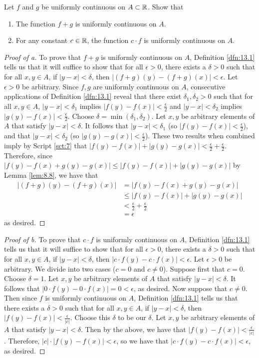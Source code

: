 \documentclass[../main.tex]{subfiles}
\begin{document}
\begin{exercise}\label{exr:13.5}
    Let $f$ and $g$ be uniformly continuous on $A\subset\mathbb{R}$. Show that
    \begin{enumerate}[label={(\alph*)}]
        \item The function $f+g$ is uniformly continuous on $A$.
        \item For any constant $c\in\mathbb{R}$, the function $c\cdot f$ is uniformly continuous on $A$.
    \end{enumerate}
    \begin{proof}[Proof of a]
        To prove that $f+g$ is uniformly continuous on $A$, Definition \ref{dfn:13.1} tells us that it will suffice to show that for all $\epsilon>0$, there exists a $\delta>0$ such that for all $x,y\in A$, if $|y-x|<\delta$, then $|(f+g)(y)-(f+g)(x)|<\epsilon$. Let $\epsilon>0$ be arbitrary. Since $f,g$ are uniformly continuous on $A$, consecutive applications of Definition \ref{dfn:13.1} reveal that there exist $\delta_1,\delta_2>0$ such that for all $x,y\in A$, $|y-x|<\delta_1$ implies $|f(y)-f(x)|<\frac{\epsilon}{2}$ and $|y-x|<\delta_2$ implies $|g(y)-f(x)|<\frac{\epsilon}{2}$. Choose $\delta=\min(\delta_1,\delta_2)$. Let $x,y$ be arbitrary elements of $A$ that satisfy $|y-x|<\delta$. It follows that $|y-x|<\delta_1$ (so $|f(y)-f(x)|<\frac{\epsilon}{2}$), and that $|y-x|<\delta_2$ (so $|g(y)-g(x)|<\frac{\epsilon}{2}$). These two results when combined imply by Script \ref{sct:7} that $|f(y)-f(x)|+|g(y)-g(x)|<\frac{\epsilon}{2}+\frac{\epsilon}{2}$. Therefore, since $|f(y)-f(x)+g(y)-g(x)|\leq|f(y)-f(x)|+|g(y)-g(x)|$ by Lemma \ref{lem:8.8}, we have that
        \begin{align*}
            |(f+g)(y)-(f+g)(x)| &= |f(y)-f(x)+g(y)-g(x)|\\
            &\leq |f(y)-f(x)|+|g(y)-g(x)|\\
            &< \frac{\epsilon}{2}+\frac{\epsilon}{2}\\
            &= \epsilon
        \end{align*}
        as desired.
    \end{proof}
    \begin{proof}[Proof of b]
        To prove that $c\cdot f$ is uniformly continuous on $A$, Definition \ref{dfn:13.1} tells us that it will suffice to show that for all $\epsilon>0$, there exists a $\delta>0$ such that for all $x,y\in A$, if $|y-x|<\delta$, then $|c\cdot f(y)-c\cdot f(x)|<\epsilon$. Let $\epsilon>0$ be arbitrary. We divide into two cases ($c=0$ and $c\neq 0$). Suppose first that $c=0$. Choose $\delta=1$. Let $x,y$ be arbitrary elements of $A$ that satisfy $|y-x|<\delta$. It follows that $|0\cdot f(y)-0\cdot f(x)|=0<\epsilon$, as desired. Now suppose that $c\neq 0$. Then since $f$ is uniformly continuous on $A$, Definition \ref{dfn:13.1} tells us that there exists a $\delta>0$ such that for all $x,y\in A$, if $|y-x|<\delta$, then $|f(y)-f(x)|<\frac{\epsilon}{|c|}$. Choose this $\delta$ to be our $\delta$. Let $x,y$ be arbitrary elements of $A$ that satisfy $|y-x|<\delta$. Then by the above, we have that $|f(y)-f(x)|<\frac{\epsilon}{|c|}$. Therefore, $|c|\cdot|f(y)-f(x)|<\epsilon$, so we have that $|c\cdot f(y)-c\cdot f(x)|<\epsilon$, as desired.

\end{proof}
\end{exercise}
\end{document}
